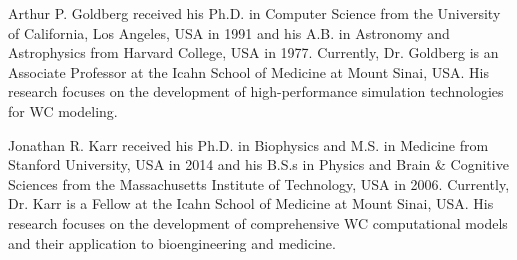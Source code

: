 \documentclass[journal,transmag,twoside]{IEEEtran}
\begin{document}
\begin{IEEEbiography}{Arthur P. Goldberg}
received his Ph.D. in Computer Science from the University of California, Los Angeles, USA in 1991 and his A.B. in Astronomy and Astrophysics from Harvard College, USA in 1977. Currently, Dr. Goldberg is an Associate Professor at the Icahn School of Medicine at Mount Sinai, USA. His research focuses on the development of high-performance simulation technologies for WC modeling.
\end{IEEEbiography}

\begin{IEEEbiography}{Jonathan R. Karr}
received his Ph.D. in Biophysics and M.S. in Medicine from Stanford University, USA in 2014 and his B.S.s in Physics and Brain \& Cognitive Sciences from the Massachusetts Institute of Technology, USA in 2006. Currently, Dr. Karr is a Fellow at the Icahn School of Medicine at Mount Sinai, USA. His research focuses on the development of comprehensive WC computational models and their application to bioengineering and medicine.
\end{IEEEbiography}

\vfill
\end{document}
